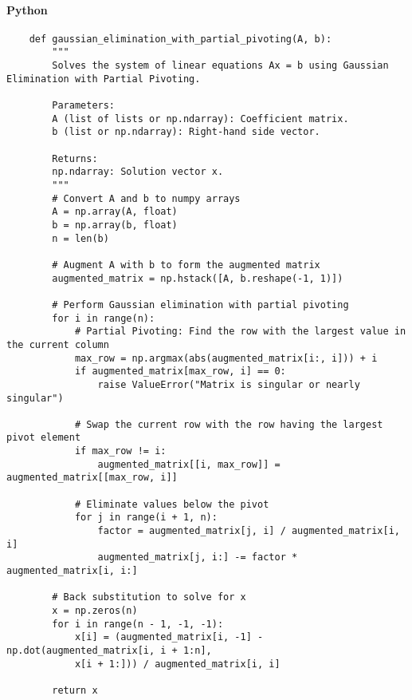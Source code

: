 \documentclass{article}
\begin{document}
            \paragraph{Python}
                \begin{verbatim}
    def gaussian_elimination_with_partial_pivoting(A, b):
        """
        Solves the system of linear equations Ax = b using Gaussian Elimination with Partial Pivoting.

        Parameters:
        A (list of lists or np.ndarray): Coefficient matrix.
        b (list or np.ndarray): Right-hand side vector.

        Returns:
        np.ndarray: Solution vector x.
        """
        # Convert A and b to numpy arrays
        A = np.array(A, float)
        b = np.array(b, float)
        n = len(b)

        # Augment A with b to form the augmented matrix
        augmented_matrix = np.hstack([A, b.reshape(-1, 1)])

        # Perform Gaussian elimination with partial pivoting
        for i in range(n):
            # Partial Pivoting: Find the row with the largest value in the current column
            max_row = np.argmax(abs(augmented_matrix[i:, i])) + i
            if augmented_matrix[max_row, i] == 0:
                raise ValueError("Matrix is singular or nearly singular")

            # Swap the current row with the row having the largest pivot element
            if max_row != i:
                augmented_matrix[[i, max_row]] = augmented_matrix[[max_row, i]]

            # Eliminate values below the pivot
            for j in range(i + 1, n):
                factor = augmented_matrix[j, i] / augmented_matrix[i, i]
                augmented_matrix[j, i:] -= factor * augmented_matrix[i, i:]

        # Back substitution to solve for x
        x = np.zeros(n)
        for i in range(n - 1, -1, -1):
            x[i] = (augmented_matrix[i, -1] - np.dot(augmented_matrix[i, i + 1:n],
            x[i + 1:])) / augmented_matrix[i, i]

        return x
                \end{verbatim}
\end{document}
